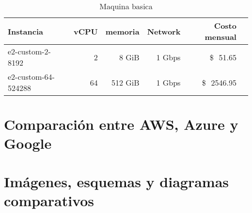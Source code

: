 \documentclass{article}
\newcommand{\usd}[1]{\SI{#1}[\$\ensuremath{\,}]{}}
\begin{document}
  




\begin{table}[!htp]\centering
\caption{Maquina basica}\label{tab:MV_google}
\scriptsize
\begin{tabular}{lrrrrr}\toprule
Instancia &vCPU &memoria &Network &Costo mensual\\\midrule
  e2-custom-2-8192 &2 &8 GiB &1 Gbps &\usd{51.65} \\
  e2-custom-64-524288 &64 &512 GiB &1 Gbps &\usd{2546.95} \\
\bottomrule
\end{tabular}
\end{table}


\section{Comparación entre AWS, Azure y Google}

\section{Imágenes, esquemas y diagramas comparativos}


\printbibliography
\end{document}
